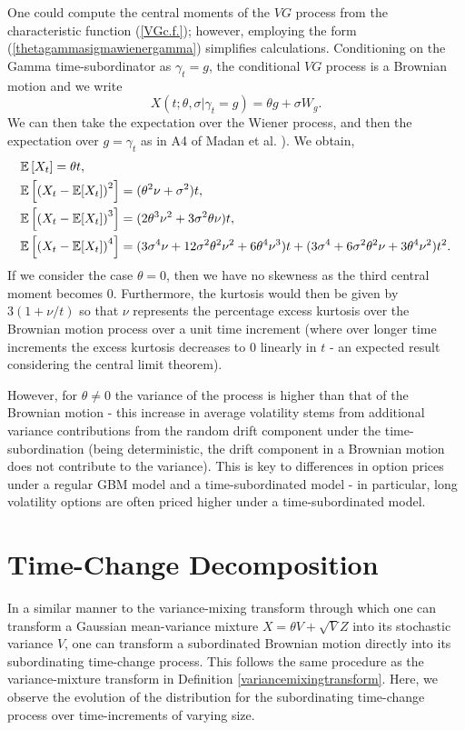 \documentclass{article}
\begin{document}
\begin{example}
One could compute the central moments of the $VG$ process from the characteristic function (\ref{VGc.f.}); however, employing the form (\ref{thetagammasigmawienergamma}) simplifies calculations. Conditioning on the Gamma time-subordinator as $\gamma_t = g$, the conditional $VG$ process is a Brownian motion and we write
\begin{equation}
    X\left(t;\theta, \sigma \big\vert \gamma_t=g\right) = \theta g +\sigma W_g.
\end{equation}
We can then take the expectation over the Wiener process, and then the expectation over $g=\gamma_t$ as in A4 of Madan et al. \cite{MadanCarrChang}). 
We obtain,
\begin{align*}
    &\mathbb{E}\left[X_t\right] = \theta t, \hspace{0.2cm}\\&\mathbb{E}\left[\left(X_t-\mathbb{E}[X_t]\right)^2\right] = (\theta^2\nu+\sigma^2)t, \hspace{0.2cm}\\&\mathbb{E}\left[\left(X_t-\mathbb{E}[X_t]\right)^3\right] = (2\theta^3\nu^2+3\sigma^2\theta\nu)t,\\ &\mathbb{E}\left[\left(X_t-\mathbb{E}[X_t]\right)^4\right] = (3\sigma^4\nu+12\sigma^2\theta^2\nu^2 + 6\theta^4\nu^3)t + (3\sigma^4+6\sigma^2\theta^2\nu+3\theta^4\nu^2)t^2.
\end{align*}
If we consider the case $\theta = 0$, then we have no skewness as the third central moment becomes $0$. Furthermore, the kurtosis would then be given by $3(1+\nu/t)$ so that $\nu$ represents the percentage excess kurtosis over the Brownian motion process over a unit time increment (where over longer time increments the excess kurtosis decreases to $0$ linearly in $t$ - an expected result considering the central limit theorem). 

However, for $\theta\neq0$ the variance of the process is higher than that of the Brownian motion - this increase in average volatility stems from additional variance contributions from the random drift component under the time-subordination (being deterministic, the drift component in a Brownian motion does not contribute to the variance). This is key to differences in option prices under a regular GBM model and a time-subordinated model - in particular, long volatility options are often priced higher under a time-subordinated model.

\end{example}

\section{Time-Change Decomposition}\label{SectionTSD}
\label{sectionTST}
In a similar manner to the variance-mixing transform through which one can transform a Gaussian mean-variance mixture $X = \theta V + \sqrt{V}Z$ into its stochastic variance $V$, one can transform a subordinated Brownian motion directly into its subordinating time-change process. This follows the same procedure as the variance-mixture transform in Definition \ref{variancemixingtransform}. Here, we observe the evolution of the distribution for the subordinating time-change process over time-increments of varying size.
\end{document}
